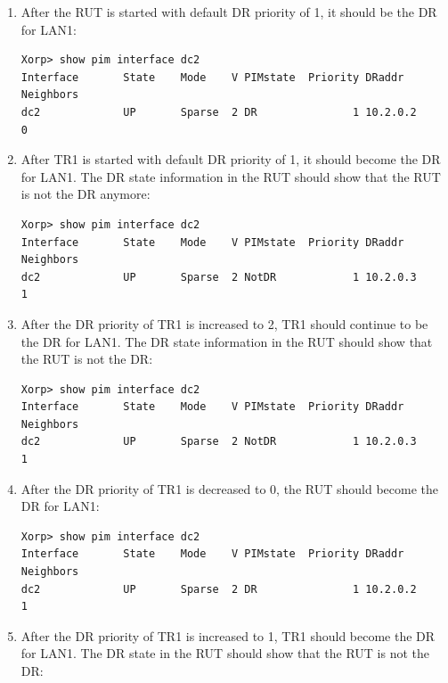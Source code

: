 \documentclass[11pt]{report}
\begin{document}
\begin{enumerate}

  \item After the RUT is started with default DR priority of 1, it should
        be the DR for LAN1:

\begin{verbatim}
Xorp> show pim interface dc2
Interface       State    Mode    V PIMstate  Priority DRaddr      Neighbors
dc2             UP       Sparse  2 DR               1 10.2.0.2            0
\end{verbatim}

  \item After TR1 is started with default DR priority of 1, it should become
        the DR for LAN1. The DR state information in the RUT should show that
        the RUT is not the DR anymore:

\begin{verbatim}
Xorp> show pim interface dc2
Interface       State    Mode    V PIMstate  Priority DRaddr      Neighbors
dc2             UP       Sparse  2 NotDR            1 10.2.0.3            1
\end{verbatim}

  \item After the DR priority of TR1 is increased to 2, TR1 should continue to
        be the DR for LAN1. The DR state information in the RUT should show
        that the RUT is not the DR:

\begin{verbatim}
Xorp> show pim interface dc2
Interface       State    Mode    V PIMstate  Priority DRaddr      Neighbors
dc2             UP       Sparse  2 NotDR            1 10.2.0.3            1
\end{verbatim}

  \item After the DR priority of TR1 is decreased to 0, the RUT should become
        the DR for LAN1:

\begin{verbatim}
Xorp> show pim interface dc2
Interface       State    Mode    V PIMstate  Priority DRaddr      Neighbors
dc2             UP       Sparse  2 DR               1 10.2.0.2            1
\end{verbatim}

  \item After the DR priority of TR1 is increased to 1, TR1 should become the
        DR for LAN1. The DR state in the RUT should show that the RUT is not
        the DR:


\end{enumerate}
\end{document}
